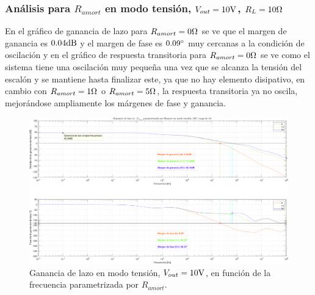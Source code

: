 
\subsubsection{Análisis para $R_{amort}$ en modo tensión, $V_{out} = 10 \si[per-mode=symbol]{\volt}$, $R_{L} = 10 \si[per-mode=symbol]{\ohm}$}

En el gráfico de ganancia de lazo para $R_{amort} = 0 \si[per-mode=symbol]{\ohm} $ se ve que el margen de ganancia es $0.04 \si[per-mode=symbol]{\decibel} $ y el margen de fase es $0.09 \si[per-mode=symbol]{\degree} $ muy cercanas a la condición de oscilación  y en el gráfico de respuesta transitoria para $R_{amort} = 0 \si[per-mode=symbol]{\ohm} $ se ve como el sistema tiene una oscilación muy pequeña una vez que se alcanza la tensión del escalón y se mantiene hasta finalizar este, ya que no hay elemento disipativo, en cambio con $R_{amort} = 1 \si[per-mode=symbol]{\ohm} $ o $R_{amort} = 5 \si[per-mode=symbol]{\ohm} $, la respuesta transitoria ya no oscila, mejorándose ampliamente los márgenes de fase y ganancia.





\clearpage

\begin{figure}[H] %
\begin{center}
\includegraphics[width=1.1 \textwidth, angle=90]{./img/plots/loop/power_supply_RAMORT_LOOP_Modo1.png}
\caption{\label{fig:fig_power_supply_RAMORT_LOOP_Modo1}\footnotesize{Ganancia de lazo en modo tensión, $V_{out} = 10 \si[per-mode=symbol]{\volt}$, en función de la frecuencia parametrizada por $R_{amort}$.}}
\end{center}
\end{figure}


\clearpage

